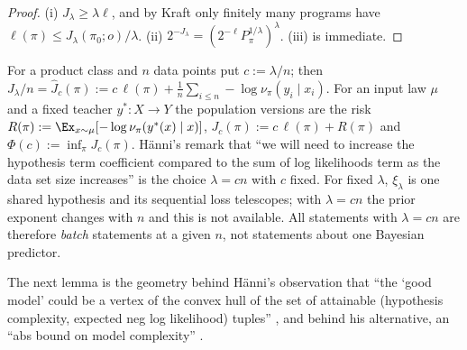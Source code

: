 \begin{proof}
(i) $J_\lambda\ge\lambda\ell$, and by Kraft only finitely many programs have $\ell(\pi)\le J_\lambda(\pi_0;o)/\lambda$. (ii) $2^{-J_\lambda}=(2^{-\ell}P_\pi^{1/\lambda})^\lambda$. (iii) is immediate.
\end{proof}

\begin{remark}[Per-sample form; $\lambda=cn$ gives batch objectives]\label{rem:setup:persample}
For a product class and $n$ data points put $c:=\lambda/n$; then $J_\lambda/n=\hat J_c(\pi):=c\,\ell(\pi)+\frac1n\sum_{i\le n}-\log\nu_\pi(y_i\mid x_i)$. For an input law $\mu$ and a fixed teacher $y^*:X\to Y$ the population versions are the risk $R(\pi):=\Ex_{x\sim\mu}[-\log\nu_\pi(y^*(x)\mid x)]$, $J_c(\pi):=c\,\ell(\pi)+R(\pi)$ and $\Phi(c):=\inf_\pi J_c(\pi)$. H\"anni's remark that ``we will need to increase the hypothesis term coefficient compared to the sum of log likelihoods term as the data set size increases'' \citep{hanni2026lesswrong} is the choice $\lambda=cn$ with $c$ fixed. For fixed $\lambda$, $\xi_\lambda$ is one shared hypothesis and its sequential loss telescopes; with $\lambda=cn$ the prior exponent changes with $n$ and this is not available. All statements with $\lambda=cn$ are therefore \emph{batch} statements at a given $n$, not statements about one Bayesian predictor.
\end{remark}

The next lemma is the geometry behind H\"anni's observation that ``the `good model' could be a vertex of the convex hull of the set of attainable (hypothesis complexity, expected neg log likelihood) tuples'' \citep{hanni2026lesswrong}, and behind his alternative, an ``abs bound on model complexity'' \citep{hanni2026notes}.

